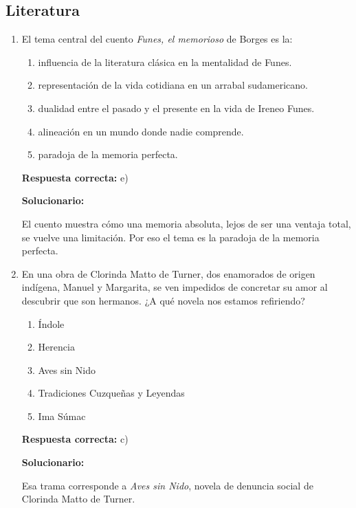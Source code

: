 \subsection*{Literatura}

\begin{enumerate}[resume]
	
	\item El tema central del cuento \textit{Funes, el memorioso} de Borges es la:
	\begin{enumerate}[label=\alph*)]
		\item influencia de la literatura clásica en la mentalidad de Funes.
		\item representación de la vida cotidiana en un arrabal sudamericano.
		\item dualidad entre el pasado y el presente en la vida de Ireneo Funes.
		\item alineación en un mundo donde nadie comprende.
		\item paradoja de la memoria perfecta.
	\end{enumerate}
	\textbf{Respuesta correcta:} e)
	
	\vspace{2mm}
	\textbf{Solucionario:}
	
	El cuento muestra cómo una memoria absoluta, lejos de ser una ventaja total, se vuelve una limitación. Por eso el tema es la paradoja de la memoria perfecta.
	
	\vspace{6mm}
	
	\item En una obra de Clorinda Matto de Turner, dos enamorados de origen indígena, Manuel y Margarita, se ven impedidos de concretar su amor al descubrir que son hermanos. ¿A qué novela nos estamos refiriendo?
	\begin{enumerate}[label=\alph*)]
		\item Índole
		\item Herencia
		\item Aves sin Nido
		\item Tradiciones Cuzqueñas y Leyendas
		\item Ima Súmac
	\end{enumerate}
	\textbf{Respuesta correcta:} c)
	
	\vspace{2mm}
	\textbf{Solucionario:}
	
	Esa trama corresponde a \textit{Aves sin Nido}, novela de denuncia social de Clorinda Matto de Turner.
	
	\vspace{6mm}
	
\end{enumerate}

